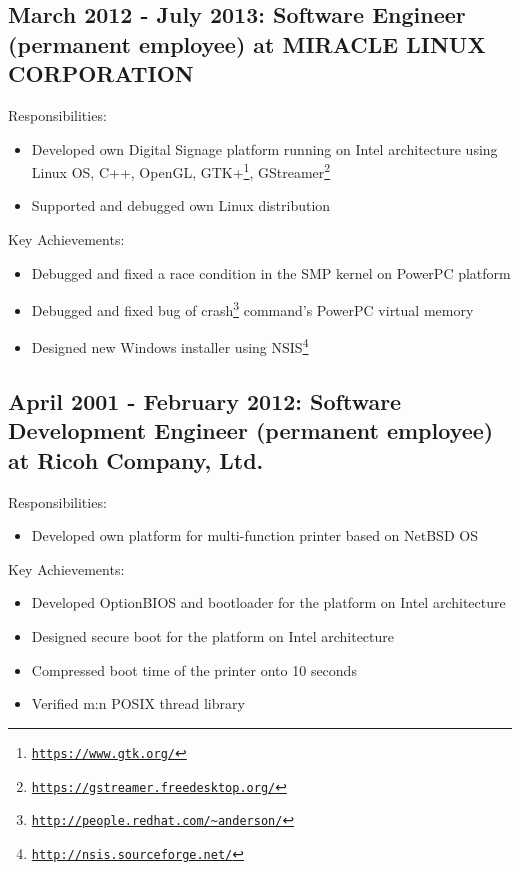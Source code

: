 \documentclass[letterpaper]{article}
\begin{document}
\subsection*{March 2012 - July 2013: Software Engineer (permanent employee) at MIRACLE LINUX CORPORATION}

\noindent Responsibilities:

\begin{itemize}
  \item Developed own Digital Signage platform running on Intel architecture using Linux OS, C++, OpenGL, GTK+\footnote{\href{https://www.gtk.org/}{\tt https://www.gtk.org/}}, GStreamer\footnote{\href{https://gstreamer.freedesktop.org/}{\tt https://gstreamer.freedesktop.org/}}
  \item Supported and debugged own Linux distribution
\end{itemize}

\noindent Key Achievements:

\begin{itemize}
  \item Debugged and fixed a race condition in the SMP kernel on PowerPC platform
  \item Debugged and fixed bug of crash\footnote{\href{http://people.redhat.com/{\textasciitilde}anderson/}{\tt http://people.redhat.com/{\textasciitilde}anderson/}} command's PowerPC virtual memory
  \item Designed new Windows installer using NSIS\footnote{\href{http://nsis.sourceforge.net/}{\tt http://nsis.sourceforge.net/}}
\end{itemize}

\subsection*{April 2001 - February 2012: Software Development Engineer (permanent employee) at Ricoh Company, Ltd.}

\noindent Responsibilities:

\begin{itemize}
  \item Developed own platform for multi-function printer based on NetBSD OS
\end{itemize}

\noindent Key Achievements:

\begin{itemize}
  \item Developed OptionBIOS and bootloader for the platform on Intel architecture
  \item Designed secure boot for the platform on Intel architecture
  \item Compressed boot time of the printer onto 10 seconds
  \item Verified m:n POSIX thread library
\end{itemize}
\end{document}
